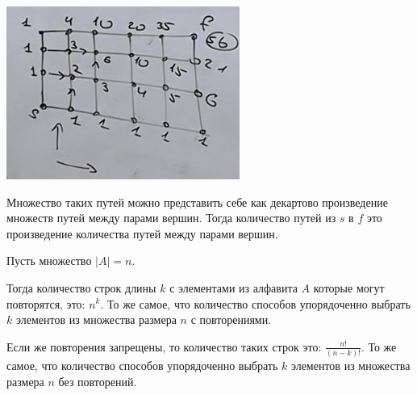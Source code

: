 \includegraphics[scale=1.5]{definitions/images/third-patch.png}

Множество таких путей можно представить себе как декартово произведение множеств путей между парами вершин. Тогда количество путей из $s$ в $f$ это произведение количества путей между парами вершин.

Пусть множество $|A| = n$.

Тогда количество строк длины $k$ с элементами из алфавита $A$ которые могут повторятся, это: $n^k$. То же самое, что количество способов упорядоченно выбрать $k$ элементов из множества размера $n$ с повторениями.

Если же повторения запрещены, то количество таких строк это: $\frac{n!}{(n-k)!}$. То же самое, что количество способов упорядоченно выбрать $k$ элементов из множества размера $n$ без повторений.